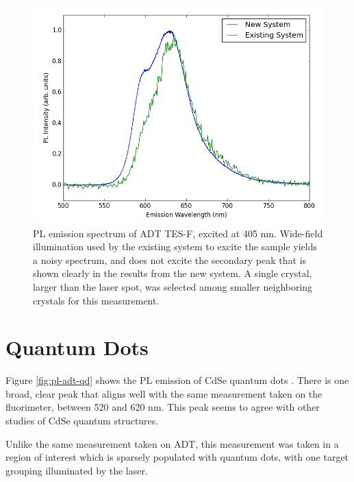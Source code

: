 \begin{figure}[h]
    \centering
    \includegraphics[width=.8\textwidth]{./img/tesf-2.png}%
    \caption[PL emission spectrum of ADT TES-F, excited at 405nm.]{PL emission spectrum of ADT TES-F, excited at 405 nm.
    Wide-field illumination used by the existing system to excite the sample
    yields a noisy spectrum, and does not excite the secondary peak that is 
    shown clearly in the results from the new system. A single crystal, larger than the laser spot, was selected among smaller neighboring crystals for this measurement. %
    }
    \label{fig:pl-adt-tesf}
\end{figure}

\section{ Quantum Dots}
Figure \ref{fig:pl-adt-qd} shows the PL emission of CdSe quantum dots . There is one broad, clear peak that aligns well with the same measurement taken on the fluorimeter, between 520 and 620 nm. This peak seems to agree with other studies of CdSe quantum structures.\cite{empedocles_photoluminescence_1996}

Unlike the same measurement taken on ADT, this measurement was taken in a region of interest which is sparsely populated with quantum dots, with one target grouping illuminated by the laser.

